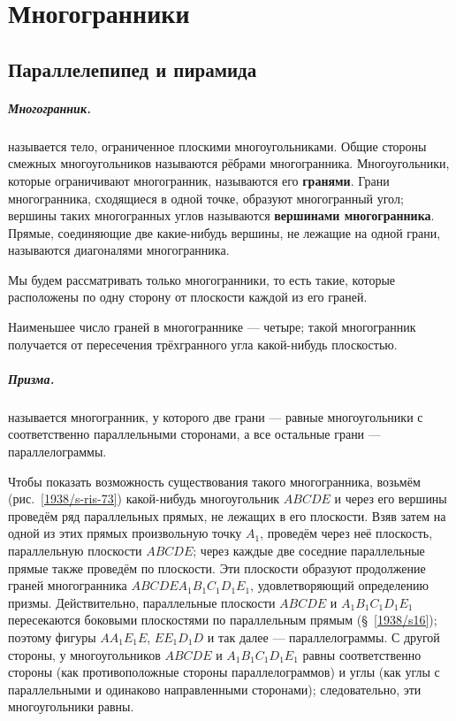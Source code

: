 \chapter{Многогранники}


\section{Параллелепипед и пирамида}

\paragraph{Многогранник.}\label{1938/s67}
 называется тело, ограниченное плоскими многоугольниками.
Общие стороны смежных многоугольников называются рёбрами многогранника.
Многоугольники, которые ограничивают многогранник, называются его \textbf{гранями}.
Грани многогранника, сходящиеся в одной точке, образуют многогранный угол;
вершины таких многогранных углов называются \textbf{вершинами многогранника}.
Прямые, соединяющие две какие-нибудь вершины, не лежащие на одной грани, называются диагоналями многогранника.

Мы будем рассматривать только  многогранники, то есть такие, которые расположены по одну сторону от плоскости каждой из его граней.

Наименьшее число граней в многограннике — четыре;
такой многогранник получается от пересечения трёхгранного угла какой-нибудь плоскостью.

\paragraph{Призма.}\label{1938/s68}
 называется многогранник, у которого две грани — равные многоугольники с соответственно параллельными сторонами, а все остальные грани — параллелограммы.

Чтобы показать возможность существования такого многогранника, возьмём (рис.~\ref{1938/s-ris-73}) какой-нибудь многоугольник $ABCDE$ и через его вершины проведём ряд параллельных прямых, не лежащих в его плоскости.
Взяв затем на одной из этих прямых произвольную точку $A_1$, проведём через неё плоскость, параллельную плоскости $ABCDE$;
через каждые две соседние параллельные прямые также проведём по плоскости.
Эти плоскости образуют продолжение граней многогранника $ABCDEA_1B_1C_1D_1E_1$, удовлетворяющий определению призмы.
Действительно, параллельные плоскости $ABCDE$ и $A_1B_1C_1D_1E_1$ пересекаются боковыми плоскостями по параллельным прямым (§~\ref{1938/s16});
поэтому фигуры $AA_1E_1E$, $EE_1D_1D$ и так далее — параллелограммы.
С другой стороны, у многоугольников $ABCDE$ и $A_1B_1C_1D_1E_1$ равны соответственно стороны (как противоположные стороны параллелограммов) и углы (как углы с параллельными и одинаково направленными сторонами);
следовательно, эти многоугольники равны.

